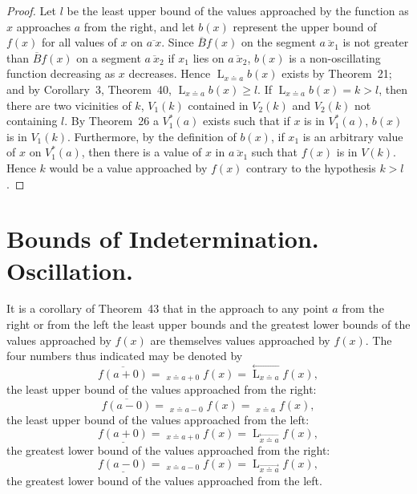 \documentclass[a4paper,12pt]{book}[2004/02/16]
\providecommand{\geqq}{\geq}
\providecommand{\colorbox}[2]{#2}
\newcommand{\correction}[2]{\colorbox{corr}{#1}}
\providecommand{\hyperlink}[2]{#2}
\providecommand{\hypertarget}[2]{#2}
\theoremstyle{ilemma}
\theoremstyle{itheorem}
\theoremstyle{iother}
\theoremstyle{icorollary}
\theoremstyle{numcorollary}
\theoremstyle{idefinition}
\begin{document}
\begin{proof}
Let $l$ be the least upper bound of the values approached by the
function as $x$ approaches $a$ from the right, and let $b(x)$
represent the upper bound of $f(x)$ for all values of $x$ on
$\overline{a\ x}$. Since $\overline{B}f(x)$ on the segment
$\overline{a\ x_1}$ is not greater than $\overline{B}f(x)$ on a
segment $\overline{a\ x_2}$ if $x_1$ lies on $\overline{a\ x_2}$,
$b(x)$ is a non-oscillating function decreasing as $x$
decreases. Hence $\displaystyle \mathop{L}_{x \doteq a} b(x)$ exists
by Theorem~\hyperlink{thm21}{21}; and by Corollary~\hyperlink{cor3p82}{3}, Theorem~\hyperlink{thm40}{40}, $\displaystyle
\mathop{L}_{x \doteq a} b(x) \geqq l$. If $\displaystyle \mathop{L}_{x
\doteq a} b(x) = k > l$, then there are two vicinities of $k$,
$V_1(k)$ contained in $V_2(k)$ and $V_2(k)$ not containing $l$. By
Theorem~\hyperlink{thm26}{26} a $V_1^*(a)$ exists such that if $x$ is in $V_1^*(a)$,
$b(x)$ is in $V_1(k)$. Furthermore, by the definition of $b(x)$, if
$x_1$ is an arbitrary value of $x$ on $V_1^*(a)$, then there is a
value of $x$ in $\overline{a\ x_1}$ such that $f(x)$ is in
$V(k)$. Hence $k$ would be a value approached by $f(x)$ contrary to
the hypothesis $k>l$.
\end{proof}

\section{Bounds of Indetermination. Oscillation.}\hypertarget{chIVsec6}{}%

It is a corollary of Theorem~\hyperlink{thm43}{43} that in the approach to any point $a$
from the right or from the left the least upper \correction{bounds}{bound} and the greatest
lower bounds of the values approached by $f(x)$ are themselves values
approached by $f(x)$. The four numbers thus indicated may be denoted
by
\[\label{limp84}
  \overline{f(a+0)} =
   \mathop{\overline{L}}_{x \doteq a+0} f(x)
  = \stackrel{\leftarrow}{\mathop{L}_{x \doteq a}} f(x),
\]
the least upper bound of the values approached from the right:
\[
  \overline{f(a-0)} =
   \mathop{\overline{L}}_{x \doteq a-0}
   f(x) =
  \mathop{\stackrel{\rightarrow}{L}}_{x \doteq a} f(x),
\]
the least upper bound of the values approached from the left:
\[
  \underline{f(a+0)} =
   \mathop{\underline{L}}_{x \doteq a + 0}
   f(x) =
  \mathop{L}_{\stackrel{\leftarrow}{x \doteq a}} f(x),
\]
the greatest lower bound of the values approached from the right:
\[
  \underline{f(a-0)} =
   \mathop{\underline{L}}_{x \doteq a-0}
   f(x) =
  \mathop{L}_{\stackrel{\rightarrow}{x \doteq a}} f(x),
\]
the greatest lower bound of the values approached from the left.
\end{document}
